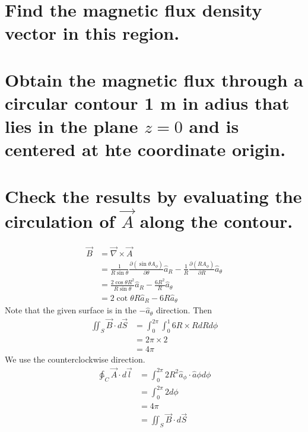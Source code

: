 \documentclass[answers]{exam}
\begin{document}
\begin{questions}
\begin{parts}
	\part{Find the magnetic flux density vector in this region.}
	\part{Obtain the magnetic flux through a circular contour 1 m in adius that lies in the plane $z=0$ and is centered at hte coordinate origin.}
	\part{Check the results by evaluating the circulation of $\vec A$ along the contour.}
\end{parts}

\begin{solution}
	\begin{align*}
		\vec B &= \vec \nabla \times \vec A \\
		       & = \frac{1}{R\sin\theta} \frac{\partial (\sin\theta A_\phi)}{\partial \theta} \hat a_R - \frac{1}{R} \frac{\partial (RA_\phi)}{\partial R} \hat a_\theta \\
		       &= \frac{2\cos\theta R^2}{R\sin\theta} \hat a_R - \frac{6R^2}{R} \hat a_\theta \\
		       &= 2\cot\theta R \hat a_R - 6R \hat a_\theta
	\end{align*}
	Note that the given surface is in the $-\hat a_\theta$ direction. Then
	\begin{align*}
		\iint_S \vec B \cdot d\vec S &= \int_0^{2\pi} \int_0^1 6R\times R dR d\phi \\
					     &= 2\pi \times 2 \\
					     &= 4\pi
	\end{align*}
	We use the counterclockwise direction.
	\begin{align*}
		\ointctrclockwise_C \vec A \cdot d\vec l &= \int_0^{2\pi} 2R^2 \hat a_\phi \cdot \hat a\phi d\phi \\
							&= \int_0^{2\pi} 2 d\phi \\
							&= 4\pi \\
							&= \iint_S \vec B \cdot d\vec S
	\end{align*}
\end{solution}



\end{questions}
\end{document}
